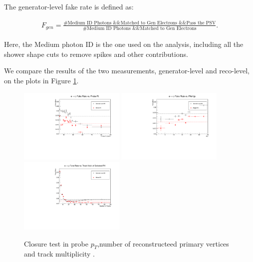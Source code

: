 The generator-level fake rate is defined as:

\begin{eqnarray}
F_{gen} = \frac{\textrm{\#Medium ID Photons \&\& Matched to Gen Electrons \&\& Pass the PSV}}{\textrm{\#Medium ID Photons \&\& Matched to Gen Electrons}}. \label{gen_fake}
\end{eqnarray}

Here, the Medium photon ID is the one used on the analysis, including all the shower shape cuts to remove spikes and other contributions.

We compare the results of the two measurements, generator-level and reco-level, on the plots in Figure \ref{closure_old}.

\begin{figure}[H]
\begin{center}
{\includegraphics[width=0.45\textwidth]{efake_figs/closure_old_pt.pdf}}
{\includegraphics[width=0.45\textwidth]{efake_figs/closure_old_pu.pdf}}
\\
{\includegraphics[width=0.45\textwidth]{efake_figs/closure_old_trk.pdf}}
\caption{Closure test in probe $p_T$,number of reconstructeed primary vertices and track multiplicity .}
\label{closure_old}
\end{center}
\end{figure}
%


